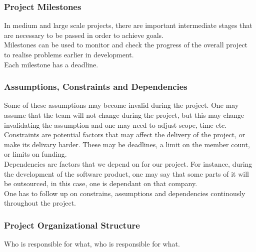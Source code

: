 \documentclass[11pt,a4paper,twocolumn]{book}
\begin{document}
\subsubsection{Project Milestones}

In medium and large scale projects, there are important intermediate stages that are necessary to be passed in order to achieve goals.\\

Milestones can be used to monitor and check the progress of the overall project to realise problems earlier in development.\\

Each milestone has a deadline.


\subsubsection{Assumptions, Constraints and Dependencies}

Some of these assumptions may become invalid during the project. One may assume that the team will not change during the project, but this may change invalidating the assumption and one may need to adjust scope, time etc.\\

Constraints are potential factors that may affect the delivery of the project, or make its delivary harder. These may be deadlines, a limit on the member count, or limits on funding.\\

Dependencies are factors that we depend on for our project. For instance, during the development of the software product, one may say that some parts of it will be outsourced, in this case, one is dependant on that company.\\

One has to follow up on constrains, assumptions and dependencies continously throughout the project.

\subsubsection{Project Organizational Structure}

Who is responsible for what, who is responsible for what.
\end{document}
